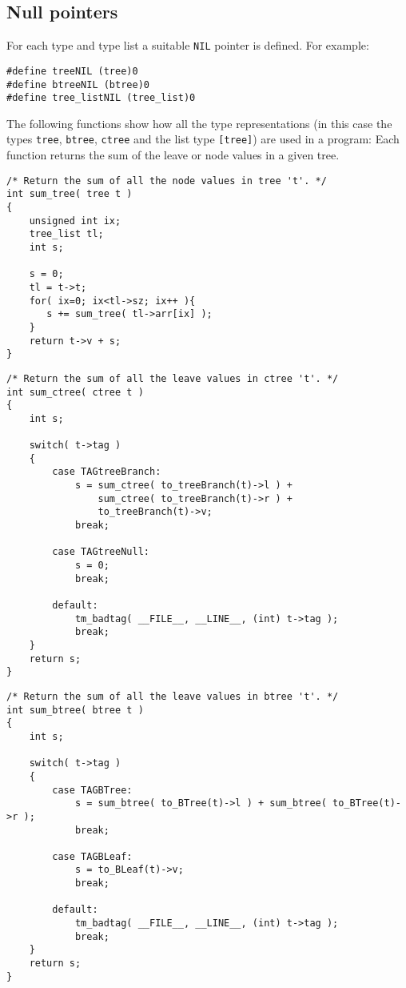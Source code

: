 \subsection{Null pointers}
For each type and type list a suitable {\tt NIL} pointer is defined.
For example:
\begin{showfile}
\begin{verbatim}
#define treeNIL (tree)0
#define btreeNIL (btree)0
#define tree_listNIL (tree_list)0
\end{verbatim}
\end{showfile}
The following functions show how all the type representations
(in this case the types {\tt tree}, {\tt btree}, {\tt ctree} and the list type
\verb+[tree]+)
are used in a program:
Each function returns the sum of the leave or node values in a given
tree.
\begin{showfile}
\begin{verbatim}
/* Return the sum of all the node values in tree 't'. */
int sum_tree( tree t )
{
    unsigned int ix;
    tree_list tl;
    int s;

    s = 0;
    tl = t->t;
    for( ix=0; ix<tl->sz; ix++ ){
       s += sum_tree( tl->arr[ix] );
    }
    return t->v + s;
}
\end{verbatim}
\end{showfile}

\begin{showfile}
\begin{verbatim}
/* Return the sum of all the leave values in ctree 't'. */
int sum_ctree( ctree t )
{
    int s;

    switch( t->tag )
    {
        case TAGtreeBranch:
            s = sum_ctree( to_treeBranch(t)->l ) +
                sum_ctree( to_treeBranch(t)->r ) +
                to_treeBranch(t)->v;
            break;

        case TAGtreeNull:
            s = 0;
            break;

        default:
            tm_badtag( __FILE__, __LINE__, (int) t->tag );
            break;
    }
    return s;
}
\end{verbatim}
\end{showfile}

\begin{showfile}
\begin{verbatim}
/* Return the sum of all the leave values in btree 't'. */
int sum_btree( btree t )
{
    int s;

    switch( t->tag )
    {
        case TAGBTree:
            s = sum_btree( to_BTree(t)->l ) + sum_btree( to_BTree(t)->r );
            break;

        case TAGBLeaf:
            s = to_BLeaf(t)->v;
            break;

        default:
            tm_badtag( __FILE__, __LINE__, (int) t->tag );
            break;
    }
    return s;
}
\end{verbatim}
\end{showfile}
